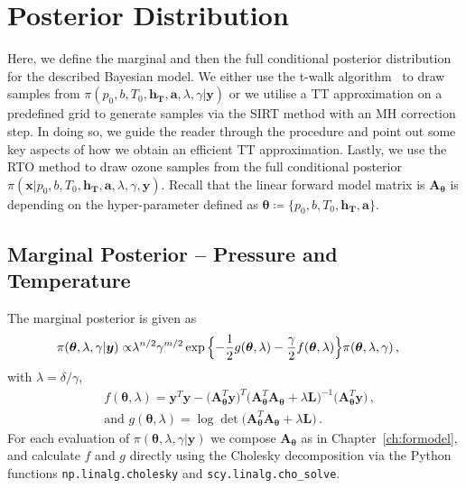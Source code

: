 \section{Posterior Distribution}
Here, we define the marginal and then the full conditional posterior distribution for the described Bayesian model.
We either use the t-walk algorithm~\cite{christen2010general} to draw samples from $\pi(p_0,b,T_0,\bm{h_T},\bm{a} ,\lambda, \gamma| \bm{y})$ or we utilise a TT approximation on a predefined grid to generate samples via the SIRT method with an MH correction step.
In doing so, we guide the reader through the procedure and point out some key aspects of how we obtain an efficient TT approximation.
Lastly, we use the RTO method to draw ozone samples from the full conditional posterior $\pi(\bm{x}|p_0,b,T_0,\bm{h_T},\bm{a} ,\lambda, \gamma, \bm{y})$.
Recall that the linear forward model matrix is $\bm{A}_{\bm{\theta}}$ is depending on the hyper-parameter defined as $\bm{\theta}  \coloneqq \{p_0,b,T_0,\bm{h_T},\bm{a}  \}$.


\subsection{Marginal Posterior -- Pressure and Temperature}
The marginal posterior is given as
\begin{align}
	\pi( \bm{\theta},\lambda,\gamma  | \bm{y}) \propto &  \lambda^{n/2} \gamma^{m/2}   \exp{ \Bigl\{ - \frac{1}{2} g ( \bm{\theta},\lambda) - \frac{\gamma}{2} f (\bm{\theta},\lambda) \Bigr\}} \pi(\bm{\theta},\lambda,\gamma ) \, ,
	\label{eq:MargPostFull}
\end{align}
with $\lambda= \delta / \gamma$,
\begin{subequations}
	\label{eq:fandgTrue}
	\begin{align}
		&f ( \bm{\theta},\lambda) = \bm{y}^T \bm{y} - \big(\bm{A}_{\bm{\theta}}^T \bm{y}\big)^T \big(\bm{A}_{\bm{\theta}}^T  \bm{A}_{\bm{\theta}} + \lambda \bm{L}\big)^{-1} \big(\bm{A}_{\bm{\theta}}^T \bm{y}\big)  \label{eq:fFullAppl} \, ,  \\
		&\text{and } g(\bm{\theta},\lambda) = \log \det \big(\bm{A}_{\bm{\theta}}^T  \bm{A}_{\bm{\theta}} + \lambda \bm{L}\big) \label{eq:gFullAppl} \, .
	\end{align}
\end{subequations}
For each evaluation of $\pi( \bm{\theta},\lambda,\gamma  | \bm{y})$ we compose $\bm{A}_{\bm{\theta}}$ as in Chapter~\ref{ch:formodel}, and calculate $f$ and $g$ directly using the Cholesky decomposition via the Python functions \texttt{np.linalg.cholesky} and \texttt{scy.linalg.cho\_solve}.

